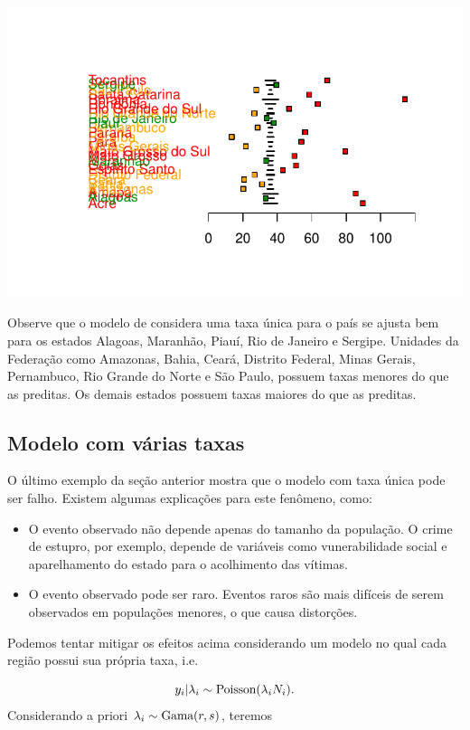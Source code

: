\documentclass[
  letterpaper,
  DIV=11,
  numbers=noendperiod]{scrreprt}
\theoremstyle{definition}
\theoremstyle{plain}
\theoremstyle{definition}
\theoremstyle{remark}
\begin{document}
\includegraphics{poisson_files/figure-pdf/unnamed-chunk-5-1.pdf}

Observe que o modelo de considera uma taxa única para o país se ajusta
bem para os estados Alagoas, Maranhão, Piauí, Rio de Janeiro e Sergipe.
Unidades da Federação como Amazonas, Bahia, Ceará, Distrito Federal,
Minas Gerais, Pernambuco, Rio Grande do Norte e São Paulo, possuem taxas
menores do que as preditas. Os demais estados possuem taxas maiores do
que as preditas.

\subsection{Modelo com várias taxas}\label{modelo-com-vuxe1rias-taxas-1}

O último exemplo da seção anterior mostra que o modelo com taxa única
pode ser falho. Existem algumas explicações para este fenômeno, como:

\begin{itemize}
\item
  O evento observado não depende apenas do tamanho da população. O crime
  de estupro, por exemplo, depende de variáveis como vunerabilidade
  social e aparelhamento do estado para o acolhimento das vítimas.
\item
  O evento observado pode ser raro. Eventos raros são mais difíceis de
  serem observados em populações menores, o que causa distorções.
\end{itemize}

Podemos tentar mitigar os efeitos acima considerando um modelo no qual
cada região possui sua própria taxa, i.e.

\[y_i|\lambda_i\sim\hbox{Poisson}(\lambda_i N_i).\] Considerando a
priori \(\lambda_i\sim\hbox{Gama}(r,s)\), teremos
\end{document}
